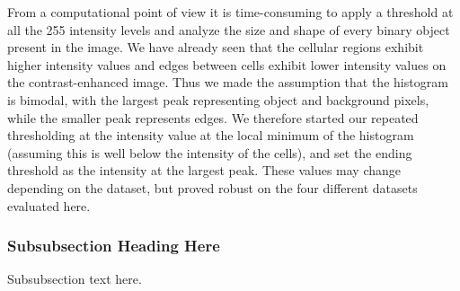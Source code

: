 \documentclass[journal]{IEEEtran}
\begin{document}
From a computational point of view it is time-consuming to apply a threshold at all the 255 intensity levels and analyze the size and shape of every binary object present in the image. We have already seen that the cellular regions exhibit higher intensity values and edges between cells exhibit lower intensity values on the contrast-enhanced image. Thus we made the assumption that the histogram is bimodal, with the largest peak representing object and background pixels, while the smaller peak represents edges. We therefore started our repeated thresholding at the intensity value at the local minimum of the histogram (assuming this is well below the intensity of the cells), and set the ending threshold as the intensity at the largest peak. These values may change depending on the dataset, but proved robust on the four different datasets evaluated here.






\subsubsection{Subsubsection Heading Here}
Subsubsection text here.


%
%

\end{document}
